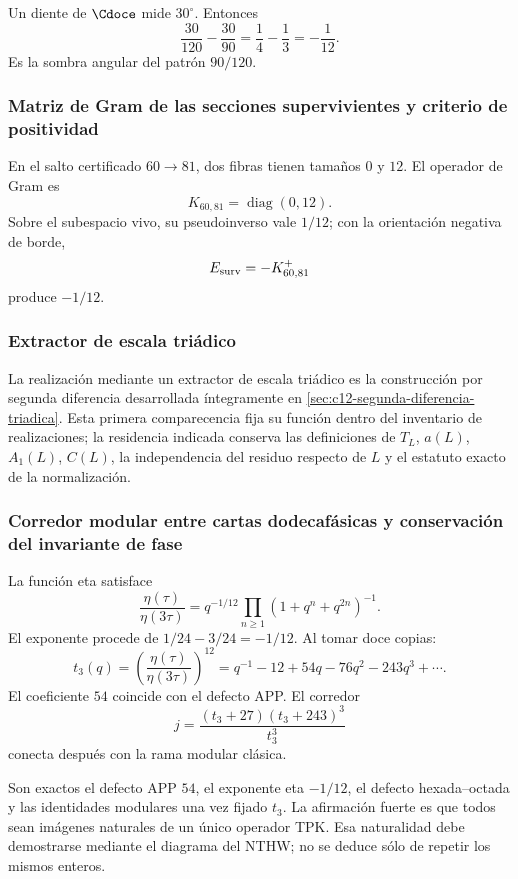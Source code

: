 Un diente de \(\Cdoce\) mide \(30^\circ\). Entonces
\[
\frac{30}{120}-\frac{30}{90}
=\frac14-\frac13
=-\frac1{12}.
\]
Es la sombra angular del patrón \(90/120\).

\subsubsection{Matriz de Gram de las secciones supervivientes y criterio de positividad}

En el salto certificado \(60\to81\), dos fibras tienen tamaños \(0\) y
\(12\). El operador de Gram es
\[
K_{60,81}=\operatorname{diag}(0,12).
\]
Sobre el subespacio vivo, su pseudoinverso vale \(1/12\); con la orientación
negativa de borde,
\[
E_{\rm surv}=-K_{60,81}^{+}
\]
produce \(-1/12\).

\subsubsection{Extractor de escala triádico}

La realización mediante un extractor de escala triádico es la construcción por
segunda diferencia desarrollada íntegramente en
\cref{sec:c12-segunda-diferencia-triadica}. Esta primera comparecencia fija su
función dentro del inventario de realizaciones; la residencia indicada conserva
las definiciones de \(T_L\), \(a(L)\), \(A_1(L)\), \(C(L)\), la independencia
del residuo respecto de \(L\) y el estatuto exacto de la normalización.

\subsubsection{Corredor modular entre cartas dodecafásicas y conservación del invariante de fase}

La función eta satisface
\[
\frac{\eta(\tau)}{\eta(3\tau)}
=q^{-1/12}\prod_{n\ge1}(1+q^n+q^{2n})^{-1}.
\]
El exponente procede de \(1/24-3/24=-1/12\). Al tomar doce copias:
\[
t_3(q)=\left(\frac{\eta(\tau)}{\eta(3\tau)}\right)^{12}
=q^{-1}-12+54q-76q^2-243q^3+\cdots.
\]
El coeficiente \(54\) coincide con el defecto APP. El corredor
\[
j=\frac{(t_3+27)(t_3+243)^3}{t_3^3}
\]
conecta después con la rama modular clásica.

\begin{exactbox}[title={Qué se ha demostrado en el corredor}]
Son exactos el defecto APP \(54\), el exponente eta \(-1/12\), el defecto
hexada--octada y las identidades modulares una vez fijado \(t_3\). La
afirmación fuerte es que todos sean imágenes naturales de un único operador
TPK. Esa naturalidad debe demostrarse mediante el diagrama del NTHW; no se
deduce sólo de repetir los mismos enteros.
\end{exactbox}

